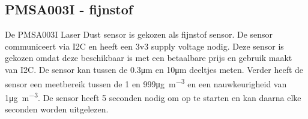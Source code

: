 \subsection{PMSA003I - fijnstof}
\label{sec:smuart}
De PMSA003I Laser Dust sensor is gekozen als fijnstof sensor. De sensor communiceert via I2C en heeft een 3v3 supply voltage nodig. Deze sensor is gekozen omdat deze beschikbaar is met een betaalbare prijs en gebruik maakt van I2C. De sensor kan tussen de 0.3\si{\micro\meter} en 10\si{\micro\meter} deeltjes meten. Verder heeft de sensor een meetbereik tussen de 1 en 999\si{\micro\gram\per\cubic\meter} en een nauwkeurigheid van 1\si{\micro\gram\per\cubic\meter}. De sensor heeft 5 seconden nodig om op te starten en kan daarna elke seconden worden uitgelezen.


